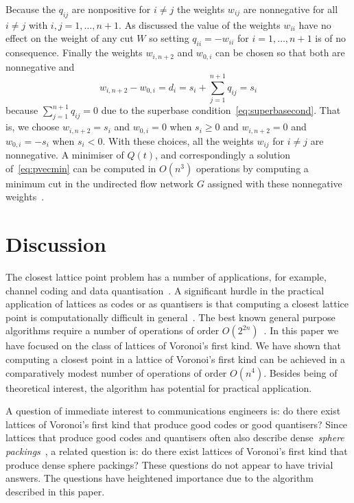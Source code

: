 \documentclass[final,leqno]{siamltex}
\begin{document}
Because the $q_{ij}$ are nonpositive for $i \neq j$ the weights $w_{ij}$ are nonnegative for all $i \neq j$ with $i,j = 1,\dots,n+1$.  As discussed the value of the weights $w_{ii}$ have no effect on the weight of any cut $W$ so setting $q_{ii} = - w_{ii}$ for  $i = 1,\dots,n+1$ is of no consequence.  Finally the weights $w_{i,n+2}$ and $w_{0,i}$ can be chosen so that both are nonnegative and 
\[
w_{i,n+2} - w_{0,i} = d_i = s_i + \sum_{j=1}^{n+1} q_{ij} = s_i
\]  
because $\sum_{j=1}^{n+1} q_{ij} = 0$ due to the superbase condition~\eqref{eq:superbasecond}.  That is, we choose $w_{i,n+2} = s_i$ and $w_{0,i} = 0$ when $s_i \geq 0$ and $w_{i,n+2}=0$ and $w_{0,i} = -s_i$ when $s_i < 0$.  With these choices, all the weights $w_{ij}$ for $i \neq j$ are nonnegative.  A minimiser of $Q(t)$, and correspondingly a solution of~\eqref{eq:pvecmin} can be computed in $O(n^3)$ operations by computing a minimum cut in the undirected flow network $G$ assigned with these nonnegative weights~\cite{Picard_min_cuts_1974,Sankaran_solving_CDMA_mincut_1998,Ulukus_cdma_mincut_1998,Cormen2001}.  %


\section{Discussion}\label{sec:discussion} 

The closest lattice point problem has a number of applications, for example, channel coding and data quantisation~\cite{Conway1983VoronoiCodes,Conway1982VoronoiRegions,Conway1982FastQuantDec,Erex2004_lattice_decoding,Erez2005}.  A significant hurdle in the practical application of lattices as codes or as quantisers is that computing a closest lattice point is computationally difficult in general~\cite{micciancio_hardness_2001}.  The best known general purpose algorithms require a number of operations of order $O(2^{2n})$~\cite{MicciancioVoulgaris_deterministic_jv_2013}.  In this paper we have focused on the class of lattices of Voronoi's first kind.  We have shown that computing a closest point in a lattice of Voronoi's first kind can be achieved in a comparatively modest number of operations of order $O(n^4)$.  Besides being of theoretical interest, the algorithm has potential for practical application.

A question of immediate interest to communications engineers is: do there exist lattices of Voronoi's first kind that produce good codes or good quantisers?  Since lattices that produce good codes and quantisers often also describe dense~\emph{sphere packings}~\cite{SPLAG}, a related question is: do there exist lattices of Voronoi's first kind that produce dense sphere packings?  These questions do not appear to have trivial answers.  The questions have heightened importance due to the algorithm described in this paper.
\end{document}
